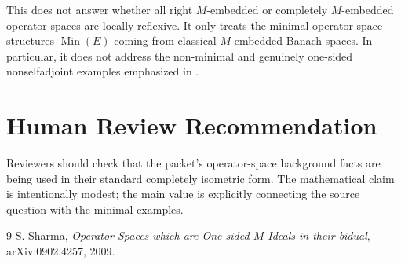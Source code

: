 \documentclass[11pt]{article}
\begin{document}
This does not answer whether all right \(M\)-embedded or completely
\(M\)-embedded operator spaces are locally reflexive.  It only treats the
minimal operator-space structures \(\operatorname{Min}(E)\) coming from
classical \(M\)-embedded Banach spaces.  In particular, it does not address the
non-minimal and genuinely one-sided nonselfadjoint examples emphasized in
\cite{Sharma2009}.

\section*{Human Review Recommendation}

Reviewers should check that the packet's operator-space background facts are
being used in their standard completely isometric form.  The mathematical
claim is intentionally modest; the main value is explicitly connecting the
source question with the minimal examples.

\begin{thebibliography}{9}
S. Sharma,
\emph{Operator Spaces which are One-sided \(M\)-Ideals in their bidual},
arXiv:0902.4257, 2009.
\end{thebibliography}
\end{document}
